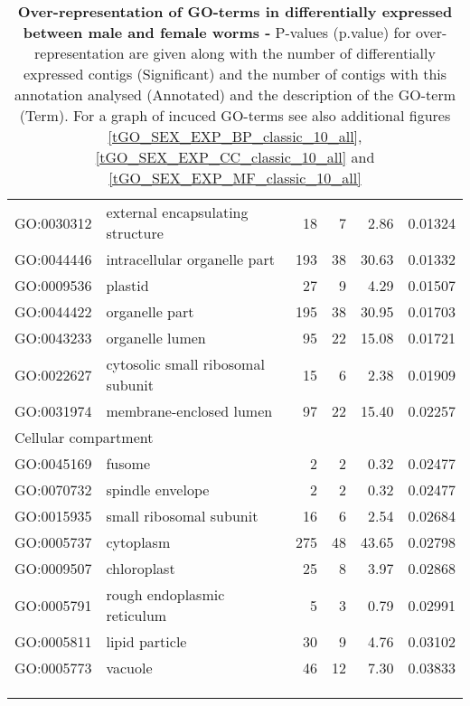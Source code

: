 \begin{longtable}{lp{4.5cm}rrrl}
  GO:0030312 & external encapsulating structure &  18 &   7 & 2.86 & 0.01324 \\ 
  GO:0044446 & intracellular organelle part & 193 &  38 & 30.63 & 0.01332 \\ 
  GO:0009536 & plastid &  27 &   9 & 4.29 & 0.01507 \\ 
  GO:0044422 & organelle part & 195 &  38 & 30.95 & 0.01703 \\ 
  GO:0043233 & organelle lumen &  95 &  22 & 15.08 & 0.01721 \\ 
  GO:0022627 & cytosolic small ribosomal subunit &  15 &   6 & 2.38 & 0.01909 \\ 
  GO:0031974 & membrane-enclosed lumen &  97 &  22 & 15.40 & 0.02257 \\ 
   \hline
   \multicolumn{6}{l}{Cellular compartment}  \\ 
GO:0045169 & fusome &   2 &   2 & 0.32 & 0.02477 \\ 
  GO:0070732 & spindle envelope &   2 &   2 & 0.32 & 0.02477 \\ 
  GO:0015935 & small ribosomal subunit &  16 &   6 & 2.54 & 0.02684 \\ 
  GO:0005737 & cytoplasm & 275 &  48 & 43.65 & 0.02798 \\ 
  GO:0009507 & chloroplast &  25 &   8 & 3.97 & 0.02868 \\ 
  GO:0005791 & rough endoplasmic reticulum &   5 &   3 & 0.79 & 0.02991 \\ 
  GO:0005811 & lipid particle &  30 &   9 & 4.76 & 0.03102 \\ 
  GO:0005773 & vacuole &  46 &  12 & 7.30 & 0.03833 \\ 
\hline\\
\caption[Over-representation of GO-terms in positively
selected]{\textbf{Over-representation of GO-terms in differentially
    expressed between male and female worms -} P-values (p.value) for
  over-representation are given along with the number of
  differentially expressed contigs (Significant) and the number of
  contigs with this annotation analysed (Annotated) and the
  description of the GO-term (Term). For a graph of incuced GO-terms
  see also additional figures \ref{tGO_SEX_EXP_BP_classic_10_all},
  \ref{tGO_SEX_EXP_CC_classic_10_all} and
  \ref{tGO_SEX_EXP_MF_classic_10_all}}\\
\label{over-de-mf-454}
\end{longtable}


